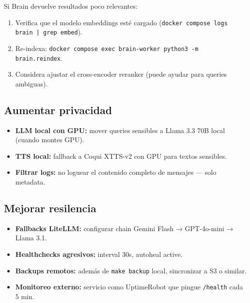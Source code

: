 \documentclass[11pt,a4paper]{article}
\begin{document}
Si Brain devuelve resultados poco relevantes:

\begin{enumerate}[leftmargin=*,itemsep=1pt]
\item Verifica que el modelo embeddings esté cargado (\texttt{docker compose logs brain | grep embed}).
\item Re-indexa: \texttt{docker compose exec brain-worker python3 -m brain.reindex}.
\item Considera ajustar el cross-encoder reranker (puede ayudar para queries ambiguas).
\end{enumerate}

\subsection{Aumentar privacidad}

\begin{itemize}[leftmargin=*,itemsep=2pt]
\item \textbf{LLM local con GPU:} mover queries sensibles a Llama 3.3 70B local (cuando montes GPU).
\item \textbf{TTS local:} fallback a Coqui XTTS-v2 con GPU para textos sensibles.
\item \textbf{Filtrar logs:} no loguear el contenido completo de mensajes — solo metadata.
\end{itemize}

\subsection{Mejorar resilencia}

\begin{itemize}[leftmargin=*,itemsep=2pt]
\item \textbf{Fallbacks LiteLLM:} configurar chain Gemini Flash → GPT-4o-mini → Llama 3.1.
\item \textbf{Healthchecks agresivos:} interval 30s, autoheal active.
\item \textbf{Backups remotos:} además de \texttt{make backup} local, sincronizar a S3 o similar.
\item \textbf{Monitoreo externo:} servicio como UptimeRobot que pingue \texttt{/health} cada 5 min.
\end{itemize}

\newpage

\end{document}

